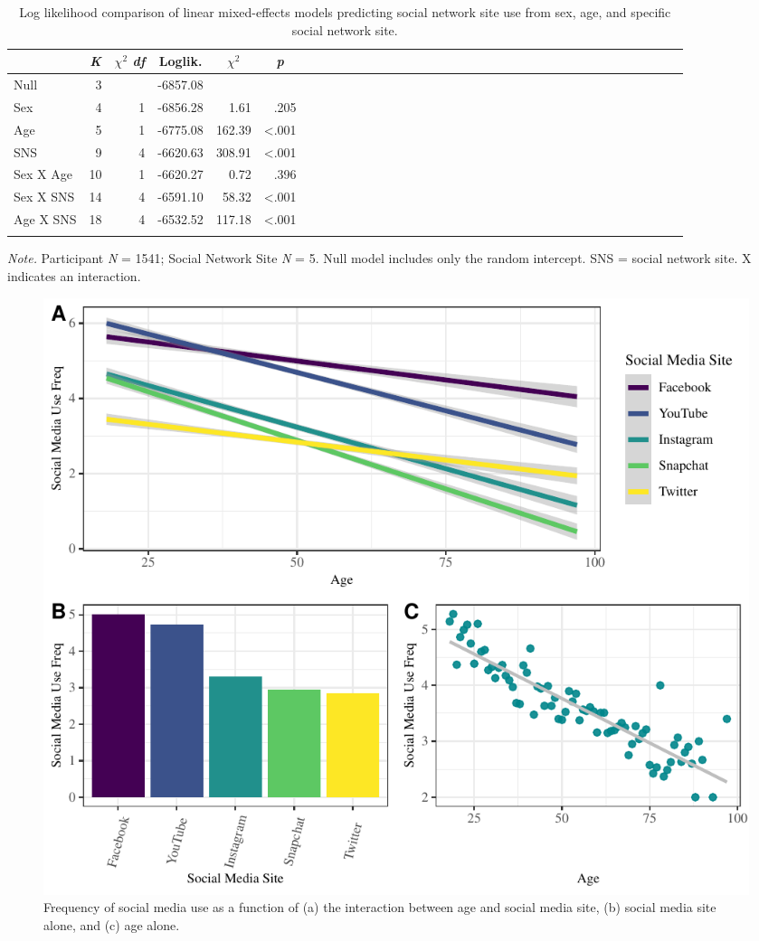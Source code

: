 \documentclass[man, fleqn, noextraspace]{apa6}
\theoremstyle{definition}
\theoremstyle{definition}
\theoremstyle{definition}
\theoremstyle{remark}
\begin{document}
\begin{table}[tbp]
\begin{center}
\begin{threeparttable}
\caption{\label{tab:df_lmer_table}Log likelihood comparison of linear mixed-effects models predicting social network site use from sex, age, and specific social network site.}
\begin{tabular}{lrrrrrlrrrrrlrrrrrlrrrrrlrrrrrlrrrrr}
\toprule
 & \multicolumn{1}{c}{\textit{K}} & \multicolumn{1}{c}{$\chi^2$ \textit{df}} & \multicolumn{1}{c}{Loglik.} & \multicolumn{1}{c}{$\chi^2$} & \multicolumn{1}{c}{\textit{p}}\\
\midrule
Null & 3 &  & -6857.08 &  & \\
Sex & 4 & 1 & -6856.28 & 1.61 & .205\\
Age & 5 & 1 & -6775.08 & 162.39 & <.001\\
SNS & 9 & 4 & -6620.63 & 308.91 & <.001\\
Sex X Age & 10 & 1 & -6620.27 & 0.72 & .396\\
Sex X SNS & 14 & 4 & -6591.10 & 58.32 & <.001\\
Age X SNS & 18 & 4 & -6532.52 & 117.18 & <.001\\
\bottomrule
\addlinespace
\end{tabular}
\begin{tablenotes}[para]
\normalsize{\textit{Note.} Participant \textit{N} = 1541; Social Network Site \textit{N} = 5. Null model includes only the random intercept. SNS = social network site. X indicates an interaction.}
\end{tablenotes}
\end{threeparttable}
\end{center}
\end{table}

\begin{figure}
\centering
\includegraphics{final_manuscript_files/figure-latex/fig1-1.pdf}
\caption{\label{fig:fig1}Frequency of social media use as a function of (a)
the interaction between age and social media site, (b) social media site
alone, and (c) age alone.}
\end{figure}
\end{document}
